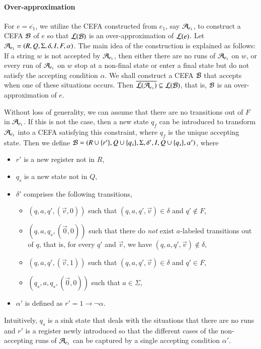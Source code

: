 \paragraph*{Over-approximation}
For $e = \overline{e_1}$, we utilize the CEFA constructed from $e_1$, say $\mathcal{A}_{e_1}$, to construct a CEFA $\mathcal{B}$ of $e$ so that $\mathcal{L}(\mathcal{B})$ is an over-approximation of $\mathcal{L}(e)$. 
Let $\mathcal{A}_{e_1} = (R, Q, \Sigma, \delta, I, F, \alpha)$. The main idea of the construction is explained as follows: If a string $w$ is not accepted by $\mathcal{A}_{e_1}$, then either there are no runs of $\mathcal{A}_{e_1}$ on $w$, or every run of $\mathcal{A}_{e_1}$ on $w$ stop at a non-final state or enter a final state but do not satisfy the accepting condition $\alpha$. We shall construct a CEFA $\mathcal{B}$ that accepts when one of these situations occurs. Then $\overline{\mathcal{L}(\mathcal{A}_{e_1})} \subseteq \mathcal{L}(\mathcal{B})$, that is, $\mathcal{B}$ is an over-approximation of $e$. 

Without loss of generality, we can assume that there are no transitions out of $F$ in $\mathcal{A}_{e_1}$. If this is not the case, then a new state $q_f$ can be introduced to transform $\mathcal{A}_{e_1}$ into a CEFA satisfying this constraint, where $q_f$ is the unique accepting state. 
Then we define $\mathcal{B}= (R \cup \{r'\}, Q \cup \{q_s\}, \Sigma, \delta', I, Q \cup \{q_s\}, \alpha')$, where
\begin{itemize}
  \item $r'$ is a new register not in $R$, 
  \item $q_s$ is a new state not in $Q$,
  \item $\delta'$ comprises the following transitions, 
  \begin{itemize}
    \item $(q, a, q', (\vec{v}, 0))$ such that $(q, a, q', \vec{v}) \in \delta$ and $q' \not \in F$,
%
    \item $(q, a, q_s,(\vec{0}, 0))$ such that there do \emph{not} exist $a$-labeled transitions out of $q$, that is, for every $q'$ and $\vec{v}$, we have $(q, a, q', \vec{v}) \not\in \delta$,
%
    \item $(q, a, q', (\vec{v}, 1))$ such that $(q, a, q', \vec{v}) \in \delta$ and $q' \in F$,
%
    \item $(q_s, a, q_s, (\vec{0}, 0))$ such that $a \in \Sigma$, 
  \end{itemize}
  \item $\alpha'$ is defined as $r' = 1 \rightarrow \neg \alpha$.
\end{itemize}
Intuitively, $q_s$ is a sink state that deals with the situations that there are no runs and $r'$ is a register newly introduced so that the different cases of the non-accepting runs of $\mathcal{A}_{e_1}$ can be captured by a single accepting condition $\alpha'$. 

